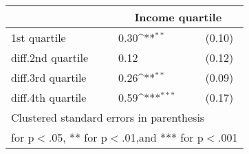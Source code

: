 {
\def\sym#1{\ifmmode^{#1}\else\(^{#1}\)\fi}
\begin{tabular*}{.5\hsize}{@{\hskip\tabcolsep\extracolsep\fill}l*{1}{lc}}
\toprule
                &\multicolumn{2}{c}{Income quartile}\\
\midrule
1st quartile    &     0.30\sym{**} &   (0.10)\\
diff.2nd quartile&     0.12         &   (0.12)\\
diff.3rd quartile&     0.26\sym{**} &   (0.09)\\
diff.4th quartile&     0.59\sym{***}&   (0.17)\\
\bottomrule
\multicolumn{3}{l}{\footnotesize Clustered standard errors in parenthesis}\\
\multicolumn{3}{l}{\footnotesize * for p$<$.05, ** for p$<$.01,and *** for p$<$.001}\\
\end{tabular*}
}
